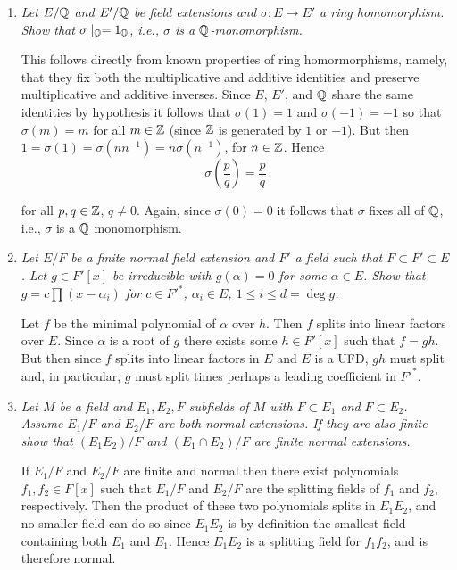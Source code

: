 \documentclass[10pt]{article}
\begin{document}
\begin{enumerate}
\begin{enumerate}
\end{enumerate}

\item \emph{Let $E/\mathbb{Q}$ and $E'/\mathbb{Q}$ be field extensions and $\sigma: E \rightarrow E'$ a ring homomorphism.  Show that $\sigma \mid_{\mathbb{Q}} = 1_{\mathbb{Q}}$, i.e., $\sigma$ is a $\mathbb{Q}$-monomorphism.}

This follows directly from known properties of ring homormorphisms, namely, that they fix both the multiplicative and additive identities and preserve multiplicative and additive inverses.  Since $E$, $E'$, and $\mathbb{Q}$ share the same identities by hypothesis it follows that $\sigma(1) = 1$ and $\sigma(-1) = -1$ so that $\sigma(m) = m$ for all $m \in \mathbb{Z}$ (since $\mathbb{Z}$ is generated by $1$ or $-1$).  But then $1 = \sigma(1) = \sigma(nn^{-1}) = n\sigma(n^{-1})$, for $n \in \mathbb{Z}$.  Hence
\[
\sigma\left(\frac{p}{q}\right) = \frac{p}{q}
\]

for all $p,q \in \mathbb{Z}$, $q \neq 0$.  Again, since $\sigma(0) = 0$ it follows that $\sigma$ fixes all of $\mathbb{Q}$, i.e., $\sigma$ is a $\mathbb{Q}$ monomorphism.

\item \emph{Let $E/F$ be a finite normal field extension and $F'$ a field such that $F \subset F' \subset E$.  Let $g \in F'[x]$ be irreducible with $g(\alpha) = 0$ for some $\alpha \in E$.  Show that $g = c\prod(x-\alpha_i)$ for $c \in F'^\ast$, $\alpha_i \in E$, $1 \leq i \leq d = \deg g$.}

Let $f$ be the minimal polynomial of $\alpha$ over $h$.  Then $f$ splits into linear factors over $E$.  Since $\alpha$ is a root of $g$ there exists some $h \in F'[x]$ such that $f = gh$.  But then since $f$ splits into linear factors in $E$ and $E$ is a UFD, $gh$ must split and, in particular, $g$ must split times perhaps a leading coefficient in $F'^\ast$.

\item \emph{Let $M$ be a field and $E_1, E_2, F$ subfields of $M$ with $F \subset E_1$ and $F \subset E_2$.  Assume $E_1/F$ and $E_2/F$ are both normal extensions.  If they are also finite show that $(E_1E_2) / F$ and $(E_1 \cap E_2)/F$ are finite normal extensions.}

If $E_1/F$ and $E_2/F$ are finite and normal then there exist polynomials $f_1, f_2 \in F[x]$ such that $E_1/F$ and $E_2/F$ are the splitting fields of $f_1$ and $f_2$, respectively.  Then the product of these two polynomials splits in $E_1E_2$, and no smaller field can do so since $E_1E_2$ is by definition the smallest field containing both $E_1$ and $E_1$.  Hence $E_1E_2$ is a splitting field for $f_1f_2$, and is therefore normal.


\end{enumerate}
\end{document}

